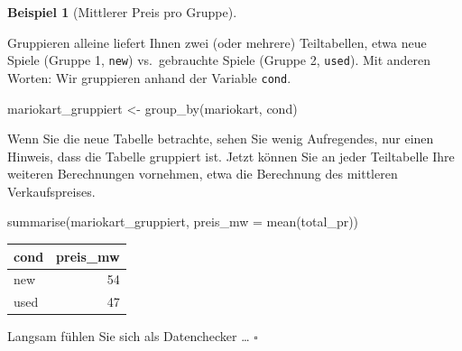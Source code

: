 \documentclass[
  letterpaper,
]{scrbook}
\newenvironment{Shaded}{\begin{snugshade}}{\end{snugshade}}
\newcommand{\AttributeTok}[1]{\textcolor[rgb]{0.40,0.45,0.13}{#1}}
\newcommand{\FunctionTok}[1]{\textcolor[rgb]{0.28,0.35,0.67}{#1}}
\newcommand{\NormalTok}[1]{\textcolor[rgb]{0.00,0.23,0.31}{#1}}
\newcommand{\OtherTok}[1]{\textcolor[rgb]{0.00,0.23,0.31}{#1}}
\theoremstyle{definition}
\theoremstyle{definition}
\newtheorem{example}{Beispiel}[chapter]
\theoremstyle{definition}
\theoremstyle{remark}
\begin{document}
\begin{example}[Mittlerer Preis pro
Gruppe]\protect\hypertarget{exm-groupby}{}\label{exm-groupby}

Gruppieren alleine liefert Ihnen zwei (oder mehrere) Teiltabellen, etwa
neue Spiele (Gruppe 1, \texttt{new}) vs.~gebrauchte Spiele (Gruppe 2,
\texttt{used}). Mit anderen Worten: Wir gruppieren anhand der Variable
\texttt{cond}.

\begin{Shaded}
\begin{Highlighting}[]
\NormalTok{mariokart\_gruppiert }\OtherTok{\textless{}{-}} \FunctionTok{group\_by}\NormalTok{(mariokart, cond)}
\end{Highlighting}
\end{Shaded}

Wenn Sie die neue Tabelle betrachte, sehen Sie wenig Aufregendes, nur
einen Hinweis, dass die Tabelle gruppiert ist. Jetzt können Sie an jeder
Teiltabelle Ihre weiteren Berechnungen vornehmen, etwa die Berechnung
des mittleren Verkaufspreises.

\begin{Shaded}
\begin{Highlighting}[]
\FunctionTok{summarise}\NormalTok{(mariokart\_gruppiert, }\AttributeTok{preis\_mw =} \FunctionTok{mean}\NormalTok{(total\_pr))}
\end{Highlighting}
\end{Shaded}

\begin{longtable}[]{@{}lr@{}}
\toprule\noalign{}
cond & preis\_mw \\
\midrule\noalign{}
\endhead
\bottomrule\noalign{}
\endlastfoot
new & 54 \\
used & 47 \\
\end{longtable}

Langsam fühlen Sie sich als Datenchecker \ldots{} \(\square\)

\end{example}
\end{document}
